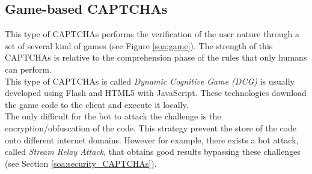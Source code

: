 \subsection{Game-based CAPTCHAs}
This type of CAPTCHAs performs the verification of the user nature through a set of several kind of games (see Figure \ref{soa:game}). The strength of this CAPTCHAs is relative to the comprehension phase of the rules that only humans can perform.\\
This type of CAPTCHAs is called \textit{Dynamic Cognitive Game (DCG)} is usually developed using Flash and HTML5 with JavaScript. These technologies download the game code to the client and execute it locally.\\
The only difficult for the bot to attack the challenge is the encryption/obfuscation of the code. This strategy prevent the store of the code onto different internet domains. However for example, there exists a bot attack, called \textit{Stream Relay Attack}, that obtains good results bypassing these challenges \cite{game_CAPTCHA} (see Section \ref{soa:security_CAPTCHAs}).
